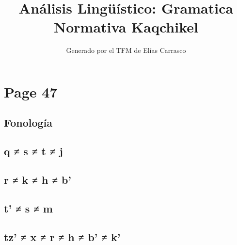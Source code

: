 \documentclass{article}%
\title{Análisis Lingüístico: Gramatica Normativa Kaqchikel}%
\author{Generado por el TFM de Elías Carrasco}%
\begin{document}
%
\normalsize%
\maketitle%
\section{Page 47}%
\label{sec:Page47}%
\subsection{Fonología}%
\label{subsec:Fonologa}%

%
\subsection{q ≠ s ≠ t ≠ j}%
\label{subsec:qstj}%

%
\subsection{r ≠ k ≠ h ≠ b’}%
\label{subsec:rkhb}%

%
\subsection{t’ ≠ s ≠ m}%
\label{subsec:tsm}%

%
\subsection{tz’ ≠ x ≠ r ≠ h ≠ b’ ≠ k’}%
\label{subsec:tzxrhbk}%

%
\end{document}

